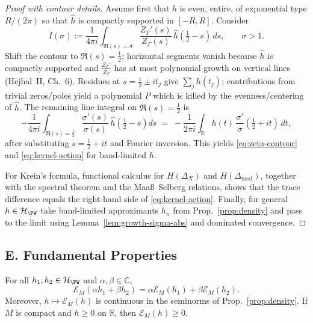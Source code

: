 \begin{proof}[Proof with contour details]
Assume first that $h$ is even, entire, of exponential type $R/(2\pi)$ so that $\hat h$ is compactly supported in $[-R,R]$. Consider
\[
 I(\sigma):=\frac{1}{4\pi i}\int_{\Re(s)=\sigma}\frac{Z_\Gamma'(s)}{Z_\Gamma(s)}\,
 \hat h\!\left(\tfrac12-s\right)\,ds,\qquad \sigma>1.
\]
Shift the contour to $\Re(s)=\tfrac12$; horizontal segments vanish because $\hat h$ is compactly supported and $\frac{Z_\Gamma'}{Z_\Gamma}$ has at most polynomial growth on vertical lines (Hejhal~II, Ch.~6). Residues at $s=\tfrac12\pm it_j$ give $\sum_j h(t_j)$; contributions from trivial zeros/poles yield a polynomial $P$ which is killed by the evenness/centering of $\hat h$. The remaining line integral on $\Re(s)=\tfrac12$ is
\[
 -\frac{1}{4\pi i}\int_{\Re(s)=\tfrac12}\frac{\sigma'(s)}{\sigma(s)}\,
 \hat h\!\left(\tfrac12-s\right) ds
 \;=\; -\frac{1}{2\pi i}\int_{\mathbb R} h(t)\,\frac{\sigma'}{\sigma}(\tfrac12+it)\,dt,
\]
after substituting $s=\tfrac12+it$ and Fourier inversion. This yields \eqref{eq:zeta-contour} and \eqref{eq:kernel-action} for band-limited $h$.

For Krein’s formula, functional calculus for $H(\Delta_X)$ and $H(\Delta_{\mathrm{mod}})$, together with the spectral theorem and the Maaß–Selberg relations, shows that the trace difference equals the right-hand side of \eqref{eq:kernel-action}. Finally, for general $h\in\mathcal H_{\PW}$ take band-limited approximants $h_n$ from Prop.~\ref{prop:density} and pass to the limit using Lemma~\ref{lem:growth-sigma-abs} and dominated convergence.
\end{proof}


\subsection*{E. Fundamental Properties}
\label{subsec:properties}

\begin{theorem}
\label{thm:props-basic}
For all $h_1,h_2\in\mathcal H_{\PW}$ and $\alpha,\beta\in\mathbb C$,
\[
 \mathcal E_M(\alpha h_1+\beta h_2)=\alpha \mathcal E_M(h_1)+\beta \mathcal E_M(h_2).
\]
Moreover, $h\mapsto \mathcal E_M(h)$ is continuous in the seminorms of Prop.~\ref{prop:density}. If $M$ is compact and $h\ge0$ on $\mathbb R$, then $\mathcal E_M(h)\ge0$.
\end{theorem}

